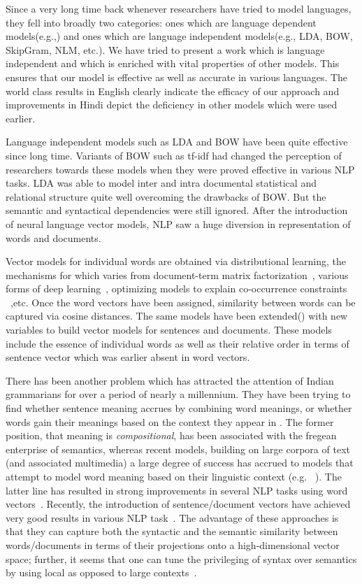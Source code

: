 \documentclass[11pt,a4paper]{article}
\begin{document}
Since a very long time back whenever researchers have tried to model languages, they fell into broadly two categories: ones which are language dependent models(e.g.,\cite{Socher:13}) and ones which are language independent models(e.g., LDA, BOW, SkipGram, NLM, etc.). We have tried to present a work which is language independent and which is enriched with vital properties of other models. This ensures that our model is effective as well as accurate in various languages. The world class results in English clearly indicate the efficacy of our approach and improvements in Hindi depict the deficiency in other models which were used earlier.

Language independent models such as LDA  and BOW have been quite effective since long time. Variants of BOW such as tf-idf had changed the perception of researchers towards these models when they were proved effective in various NLP tasks. LDA was able to model inter and intra documental statistical and relational structure quite well overcoming the drawbacks of BOW. But the semantic and syntactical dependencies were still ignored. After the introduction of neural language vector models,  NLP saw a huge diversion in representation of words and documents.

Vector models for individual words are obtained via distributional learning, the mechanisms for which varies from document-term matrix factorization~\cite{Landauer:97}, various forms of deep learning~\cite{Collobert:08,Turian:10,Socher:13}, optimizing models to explain co-occurrence constraints ~\cite{Mikolov:13a,Pennington:14},etc. Once the word vectors have been assigned, similarity between words can be captured via cosine distances. The same models have been extended(\cite{Le:14}) with new variables to build vector models for sentences and documents. These models include the essence of individual words as well as their relative order in terms of sentence vector which was earlier absent in word vectors.

There has been another problem which has attracted the attention of Indian grammarians for over a period of nearly a millennium. They have been trying to find whether sentence meaning accrues by combining word meanings, or whether words gain their meanings based on the context they appear in \cite{Matilal:90}.  The former position, that meaning is {\em compositional}, has been associated with the fregean enterprise of semantics, whereas recent models, building on large corpora of text (and associated multimedia) a large degree of success has accrued to models that attempt to model word meaning based on their linguistic context (e.g. ~\cite{Landauer:97}). The latter line has resulted in strong improvements in several NLP tasks using word vectors~\cite{Collobert:08,Turian:10,Mikolov:13a,Socher:13}. Recently, the introduction of sentence/document vectors have achieved very good results in various NLP task~\cite{Le:14}. The advantage of these approaches is that they can capture both the syntactic and the semantic similarity between words/documents in terms of their projections onto a high-dimensional vector space; further, it seems that one can tune the privileging of syntax over semantics by using local as opposed to large contexts~\cite{Huang:12}. 
\end{document}
